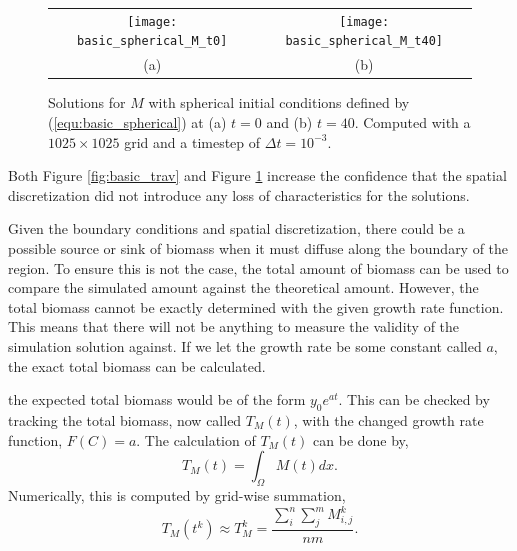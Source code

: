   \begin{figure}
    \centering
    \begin{tabular}{c c}
      \texttt{[image: basic\_spherical\_M\_t0]} & 
      \texttt{[image: basic\_spherical\_M\_t40]} \\
      (a) & (b)
    \end{tabular}
    \caption{Solutions for $M$ with spherical initial conditions defined by (\ref{equ:basic_spherical}) at (a) $t = 0$ and (b) $t = 40$. Computed with a $1025 \times 1025$ grid and a timestep of $\Delta t = 10^{-3}$.}
    \label{fig:basic_spherical}
  \end{figure}
  
  Both Figure \ref{fig:basic_trav} and Figure \ref{fig:basic_spherical} increase the confidence that the spatial discretization did not introduce any loss of characteristics for the solutions.
    
  Given the boundary conditions and spatial discretization, there could be a possible source or sink of biomass when it must diffuse along the boundary of the region.
  To ensure this is not the case, the total amount of biomass can be used to compare the simulated amount against the theoretical amount. 
  However, the total biomass cannot be exactly determined with the given growth rate function.
  This means that there will not be anything to measure the validity of the simulation solution against.
  If we let the growth rate be some constant called $a$, the exact total biomass can be calculated.

  the expected total biomass would be of the form $y_0 e^{at}$.
  This can be checked by tracking the total biomass, now called $T_{M}(t)$, with the changed growth rate function, $F(C) = a$.
  The calculation of $T_{M}(t)$ can be done by,
  \begin{equation} \label{equ:total_biomass}
    T_{M}(t) = \int_{\Omega} M(t) dx.
  \end{equation}
  Numerically, this is computed by grid-wise summation,
  \begin{equation}
    T_{M}(t^k) \approx T_{M}^{k} = \frac{ \sum^n_i \sum^m_j M^{k}_{i,j} }{nm}.
  \end{equation}

